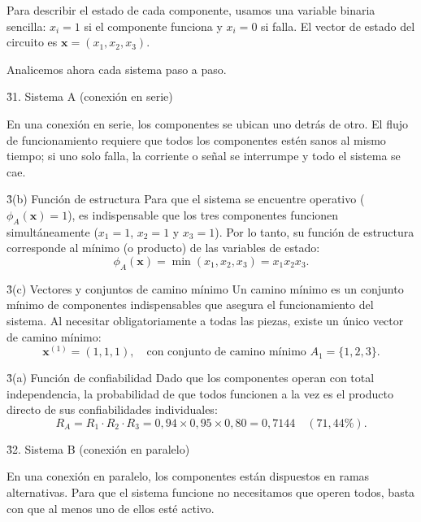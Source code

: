 \documentclass[practices.tex]{subfiles}%
\begin{document}
Para describir el estado de cada componente, usamos una variable binaria sencilla: $x_i = 1$ si el componente funciona y $x_i = 0$ si falla. El vector de estado del circuito es $\mathbf{x} = (x_1, x_2, x_3)$.

Analicemos ahora cada sistema paso a paso.

\vspace{3mm}
\h3{1. Sistema A (conexión en serie)}

En una conexión en serie, los componentes se ubican uno detrás de otro. El flujo de funcionamiento requiere que todos los componentes estén sanos al mismo tiempo; si uno solo falla, la corriente o señal se interrumpe y todo el sistema se cae.

\h3{(b) Función de estructura}
Para que el sistema se encuentre operativo ($\phi_A(\mathbf{x}) = 1$), es indispensable que los tres componentes funcionen simultáneamente ($x_1 = 1$, $x_2 = 1$ y $x_3 = 1$). Por lo tanto, su función de estructura corresponde al mínimo (o producto) de las variables de estado:
\begin{equation*}
    \phi_A(\mathbf{x}) = \min(x_1, x_2, x_3) = x_1 x_2 x_3.
\end{equation*}

\h3{(c) Vectores y conjuntos de camino mínimo}
Un camino mínimo es un conjunto mínimo de componentes indispensables que asegura el funcionamiento del sistema. Al necesitar obligatoriamente a todas las piezas, existe un único vector de camino mínimo:
\begin{equation*}
    \mathbf{x}^{(1)} = (1, 1, 1), \quad \text{con conjunto de camino mínimo } A_1 = \{1, 2, 3\}.
\end{equation*}

\h3{(a) Función de confiabilidad}
Dado que los componentes operan con total independencia, la probabilidad de que todos funcionen a la vez es el producto directo de sus confiabilidades individuales:
\begin{equation*}
    R_A = R_1 \cdot R_2 \cdot R_3 = 0{,}94 \times 0{,}95 \times 0{,}80 = 0{,}7144 \quad (71{,}44\%).
\end{equation*}

\vspace{3mm}
\h3{2. Sistema B (conexión en paralelo)}

En una conexión en paralelo, los componentes están dispuestos en ramas alternativas. Para que el sistema funcione no necesitamos que operen todos, basta con que al menos uno de ellos esté activo.
\end{document}
